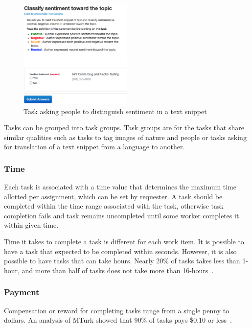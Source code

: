 \begin{figure}[ht]
	\centering
	\includegraphics[width=0.5\textwidth]{figures/sample/sentiment.png}
	\caption{Task asking people to distinguish sentiment in a text snippet}
	\label{fig:samplesentiment}
\end{figure}

\newpage

Tasks can be grouped into task groups. Task groups are for the tasks that share 
similar qualities such as tasks to tag images of nature and people or tasks asking
for translation of a text snippet from a language to another.

\subsubsection{Time}
Each task is associated with a time value that determines the maximum time 
allotted per assignment, which can be set by requester. A task should be completed 
within the time range associated with the task, otherwise task completion fails and 
task remains uncompleted until some worker completes it within given time.

Time it takes to complete a task is different for each work item. It is possible 
to have a task that expected to be completed within seconds. However, it is 
also possible to have tasks that can take hours. Nearly 20\% of tasks takes 
less than 1-hour, and more than half of tasks does not 
take more than 16-hours~\cite{Ipeirotis2010}.

\subsubsection{Payment}
Compensation or reward for completing tasks range from a single penny to dollars. 
An analysis of MTurk showed that 90\% of tasks pays \$0.10 or less~\cite{Ipeirotis2010}.

